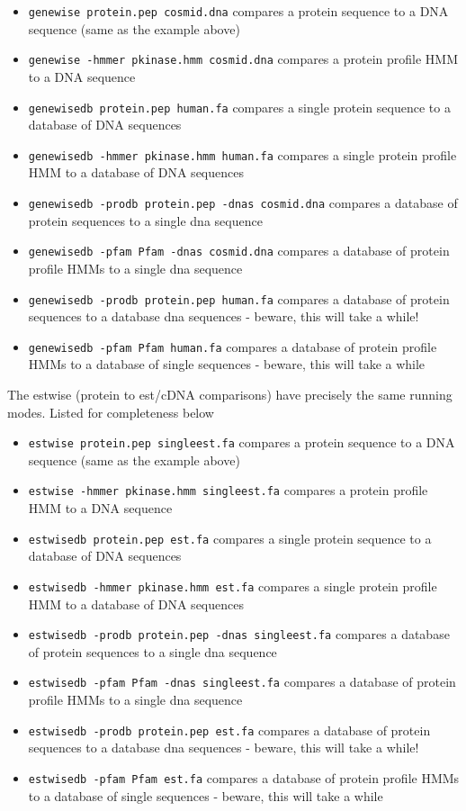 \documentclass{article}
\begin{document}
\begin{itemize}
\item \hbox{\tt{genewise protein.pep cosmid.dna}} compares a protein sequence to a DNA sequence (same
as the example above)
\item \hbox{\tt{genewise -hmmer pkinase.hmm cosmid.dna}} compares a protein profile HMM to
a DNA sequence
\item \hbox{\tt{genewisedb protein.pep human.fa}} compares a single protein sequence to a 
database of DNA sequences
\item \hbox{\tt{genewisedb -hmmer pkinase.hmm human.fa}} compares a single protein profile HMM to
a database of DNA sequences
\item \hbox{\tt{genewisedb -prodb protein.pep -dnas cosmid.dna}} compares a database of protein
sequences to a single dna sequence
\item \hbox{\tt{genewisedb -pfam Pfam -dnas cosmid.dna}} compares a database of protein profile HMMs
to a single dna sequence
\item \hbox{\tt{genewisedb -prodb protein.pep human.fa}} compares a database of protein
sequences to a database dna sequences - beware, this will take a while!
\item \hbox{\tt{genewisedb -pfam Pfam human.fa}} compares a database of protein profile HMMs
to a database of single sequences - beware, this will take a while
\end{itemize}

The estwise (protein to est/cDNA comparisons) have precisely the same running modes.
Listed for completeness below

\begin{itemize}
\item \hbox{\tt{estwise protein.pep singleest.fa}} compares a protein sequence to a DNA sequence (same
as the example above)
\item \hbox{\tt{estwise -hmmer pkinase.hmm singleest.fa}} compares a protein profile HMM to
a DNA sequence
\item \hbox{\tt{estwisedb protein.pep est.fa}} compares a single protein sequence to a 
database of DNA sequences
\item \hbox{\tt{estwisedb -hmmer pkinase.hmm est.fa}} compares a single protein profile HMM to
a database of DNA sequences
\item \hbox{\tt{estwisedb -prodb protein.pep -dnas singleest.fa}} compares a database of protein
sequences to a single dna sequence
\item \hbox{\tt{estwisedb -pfam Pfam -dnas singleest.fa}} compares a database of protein profile HMMs
to a single dna sequence
\item \hbox{\tt{estwisedb -prodb protein.pep est.fa}} compares a database of protein
sequences to a database dna sequences - beware, this will take a while!
\item \hbox{\tt{estwisedb -pfam Pfam est.fa}} compares a database of protein profile HMMs
to a database of single sequences - beware, this will take a while
\end{itemize}
\end{document}
